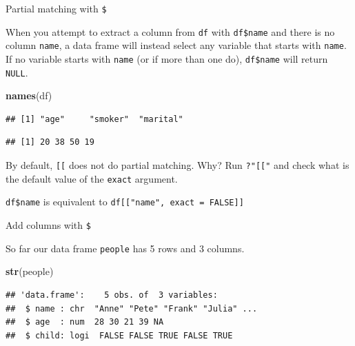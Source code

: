 \documentclass[ignorenonframetext,]{beamer}
\newenvironment{Shaded}{\begin{snugshade}}{\end{snugshade}}
\newcommand{\KeywordTok}[1]{\textcolor[rgb]{0.13,0.29,0.53}{\textbf{#1}}}
\newcommand{\NormalTok}[1]{#1}
\newcommand{\OperatorTok}[1]{\textcolor[rgb]{0.81,0.36,0.00}{\textbf{#1}}}
\begin{document}
\begin{frame}[fragile]{Partial matching with \texttt{\$}}
\protect\hypertarget{partial-matching-with}{}

When you attempt to extract a column from \texttt{df} with
\texttt{df\$name} and there is no column \texttt{name}, a data frame
will instead select any variable that starts with \texttt{name}. If no
variable starts with \texttt{name} (or if more than one do),
\texttt{df\$name} will return \texttt{NULL}.

\begin{Shaded}
\begin{Highlighting}[]
\KeywordTok{names}\NormalTok{(df)}
\end{Highlighting}
\end{Shaded}

\begin{verbatim}
## [1] "age"     "smoker"  "marital"
\end{verbatim}

\begin{Shaded}
\end{Shaded}

\begin{verbatim}
## [1] 20 38 50 19
\end{verbatim}

By default, \texttt{{[}{[}} does not do partial matching. Why? Run
\texttt{?"{[}{[}"} and check what is the default value of the
\texttt{exact} argument.

\texttt{df\$name} is equivalent to
\texttt{df{[}{[}"name",\ exact\ =\ FALSE{]}{]}}

\end{frame}

\begin{frame}[fragile]{Add columns with \texttt{\$}}
\protect\hypertarget{add-columns-with}{}

So far our data frame \texttt{people} has 5 rows and 3 columns.

\begin{Shaded}
\begin{Highlighting}[]
\KeywordTok{str}\NormalTok{(people)}
\end{Highlighting}
\end{Shaded}

\begin{verbatim}
## 'data.frame':    5 obs. of  3 variables:
##  $ name : chr  "Anne" "Pete" "Frank" "Julia" ...
##  $ age  : num  28 30 21 39 NA
##  $ child: logi  FALSE FALSE TRUE FALSE TRUE
\end{verbatim}

\end{frame}
\end{document}

